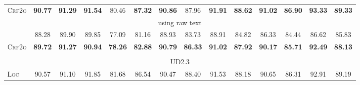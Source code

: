\begin{table*}[tb]
\begin{tabularx}{\textwidth}{lccccccccccccc}
		\textsc{Crf2o}                    & \textbf{90.77} & \textbf{91.29} & \textbf{91.54}\rlap{$^\dagger$}  & 80.46                           & \textbf{87.32}\rlap{$^\dagger$} & \textbf{90.86}\rlap{$^\dagger$}  & 87.96                           & \textbf{91.91}\rlap{$^\ddagger$} & \textbf{88.62}\rlap{$^\ddagger$} & \textbf{91.02}\rlap{$^\dagger$} & \textbf{86.90}\rlap{$^\ddagger$} & \textbf{93.33}\rlap{$^\ddagger$} & \textbf{89.33}\rlap{$^\ddagger$} \\[1pt]
		\multicolumn{14}{c}{using raw text}                                                                                                                                                                                                                                                                                                                                                                                                                              \\[1pt]
		\citet{ji-etal-2019-graph}        & 88.28          & 89.90          & 89.85                            & 77.09                           & 81.16                           & 88.93                            & 83.73                           & 88.91                            & 84.82                            & 86.33                           & 84.44                            & 86.62                            & 85.83                            \\
		\textsc{Crf2o}                    & \textbf{89.72} & \textbf{91.27} & \textbf{90.94}                   & \textbf{78.26}                  & \textbf{82.88}                  & \textbf{90.79}                   & \textbf{86.33}                  & \textbf{91.02}                   & \textbf{87.92}                   & \textbf{90.17}                  & \textbf{85.71}                   & \textbf{92.49}                   & \textbf{88.13}                   \\
		\hline
		\\[-15pt]
		\multicolumn{14}{c}{UD2.3}                                                                                                                                                                                                                                                                                                                                                                                                                                       \\[1pt]
		\textsc{Loc}                      & 90.57          & 91.10          & 91.85                            & 81.68                           & 86.54                           & 90.47                            & 88.40                           & 91.53                            & 88.18                            & 90.65                           & 86.31                            & 92.91                            & 89.19                            \\

\end{tabularx}
\end{table*}
